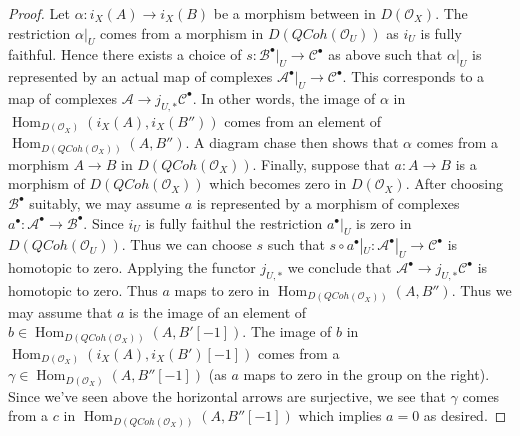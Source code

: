 \documentclass{amsart}
\theoremstyle{plain}
\theoremstyle{definition}
\theoremstyle{remark}
\numberwithin{equation}{subsection}
\def\Hom{\mathop{\mathrm{Hom}}\nolimits}
\def\QCoh{\mathit{QCoh}}
\begin{document}
\begin{proof}
\medskip\noindent
Let $\alpha : i_X(A) \to i_X(B)$ be a morphism between
in $D(\mathcal{O}_X)$. The restriction $\alpha|_U$ comes from a
morphism in $D(\QCoh(\mathcal{O}_U))$ as $i_U$ is fully faithful.
Hence there exists a choice of
$s : \mathcal{B}^\bullet|_U \to \mathcal{C}^\bullet$ as above
such that $\alpha|_U$ is represented by an actual map of complexes
$\mathcal{A}^\bullet|_U \to \mathcal{C}^\bullet$.
This corresponds to a map of complexes
$\mathcal{A} \to j_{U, *}\mathcal{C}^\bullet$.
In other words, the image of $\alpha$ in
$\Hom_{D(\mathcal{O}_X)}(i_X(A), i_X(B''))$ comes from
an element of $\Hom_{D(\QCoh(\mathcal{O}_X))}(A, B'')$.
A diagram chase then shows that $\alpha$ comes from a morphism
$A \to B$ in $D(\QCoh(\mathcal{O}_X))$. Finally, suppose
that $a : A \to B$ is a morphism of $D(\QCoh(\mathcal{O}_X))$
which becomes zero in $D(\mathcal{O}_X)$. After choosing $\mathcal{B}^\bullet$
suitably, we may assume $a$ is represented by a morphism of complexes
$a^\bullet : \mathcal{A}^\bullet \to \mathcal{B}^\bullet$.
Since $i_U$ is fully faithul the restriction $a^\bullet|_U$ is zero
in $D(\QCoh(\mathcal{O}_U))$. Thus we can choose $s$
such that
$s \circ a^\bullet|_U : \mathcal{A}^\bullet|_U \to \mathcal{C}^\bullet$
is homotopic to zero. Applying the functor $j_{U, *}$ we conclude that
$\mathcal{A}^\bullet \to j_{U, *}\mathcal{C}^\bullet$ is homotopic
to zero. Thus $a$ maps to zero in
$\Hom_{D(\QCoh(\mathcal{O}_X))}(A, B'')$.
Thus we may assume that $a$ is the image of an element
of $b \in \Hom_{D(\QCoh(\mathcal{O}_X))}(A, B'[-1])$.
The image of $b$ in $\Hom_{D(\mathcal{O}_X)}(i_X(A), i_X(B')[-1])$
comes from a $\gamma \in \Hom_{D(\mathcal{O}_X)}(A, B''[-1])$
(as $a$ maps to zero in the group on the right). Since we've
seen above the horizontal arrows are surjective, we see
that $\gamma$ comes from a $c$ in
$\Hom_{D(\QCoh(\mathcal{O}_X))}(A, B''[-1])$
which implies $a = 0$ as desired.


\end{proof}
\end{document}
